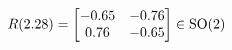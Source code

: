 \documentclass[preview]{standalone}
\begin{document}
\begin{align*}
\special{dvisvgm:raw <g id='unique000'>}R(2.28) = \begin{bmatrix} -0.65 & -0.76 \\ 0.76 & -0.65 \end{bmatrix} \in \text{SO}(2)\special{dvisvgm:raw </g>}
\end{align*}
\end{document}
